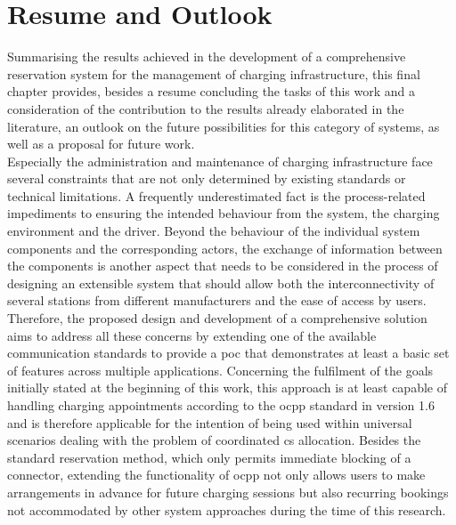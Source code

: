 

\chapter{Resume and Outlook}
\label{ch:Resume and Outlook}

Summarising the results achieved in the development of a comprehensive reservation system for the management of charging infrastructure, this final chapter provides, besides a resume concluding the tasks of this work and a consideration of the contribution to the results already elaborated in the literature, an outlook on the future possibilities for this category of systems, as well as a proposal for future work. \\
\noindent Especially the administration and maintenance of charging infrastructure face several constraints that are not only determined by existing standards or technical limitations. A frequently underestimated fact is the process-related impediments to ensuring the intended behaviour from the system, the charging environment and the driver.
Beyond the behaviour of the individual system components and the corresponding actors, the exchange of information between the components is another aspect that needs to be considered in the process of designing an extensible system that should allow both the interconnectivity of several stations from different manufacturers and the ease of access by users.
Therefore, the proposed design and development of a comprehensive solution aims to address all these concerns by extending one of the available communication standards to provide a \acrshort{poc} that demonstrates at least a basic set of features across multiple applications.
Concerning the fulfilment of the goals initially stated at the beginning of this work, this approach is at least capable of handling charging appointments according to the \acrshort{ocpp} standard in version 1.6 and is therefore applicable for the intention of being used within universal scenarios dealing with the problem of coordinated \acrshort{cs} allocation. 
Besides the standard reservation method, which only permits immediate blocking of a connector, extending the functionality of \acrshort{ocpp} not only allows users to make arrangements in advance for future charging sessions but also recurring bookings not accommodated by other system approaches during the time of this research.
